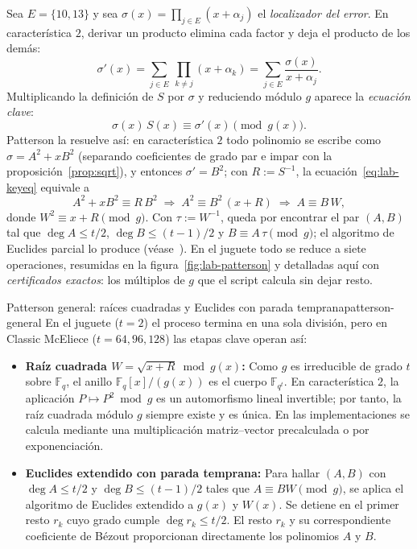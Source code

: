 \documentclass[11pt,a4paper,oneside]{report}
\newcommand{\GF}[1]{\mathbb{F}_{#1}}
\begin{document}
Sea $E=\{10,13\}$ y sea $\sigma(x)=\prod_{j\in E}(x+\alpha_j)$ el
\emph{localizador del error}. En característica $2$, derivar un producto
elimina cada factor y deja el producto de los demás:
\[
\sigma'(x)=\sum_{j\in E}\ \prod_{k\neq j}(x+\alpha_k)
=\sum_{j\in E}\frac{\sigma(x)}{x+\alpha_j}.
\]
Multiplicando la definición de $S$ por $\sigma$ y reduciendo módulo $g$
aparece la \emph{ecuación clave}:
\begin{equation}
\sigma(x)\,S(x)\equiv\sigma'(x)\pmod{g(x)}.
\label{eq:lab-keyeq}
\end{equation}
Patterson la resuelve así: en característica $2$ todo polinomio se
escribe como $\sigma=A^2+xB^2$ (separando coeficientes de grado par e
impar con la proposición~\ref{prop:sqrt}), y entonces $\sigma'=B^2$; con
$R:=S^{-1}$, la ecuación~\eqref{eq:lab-keyeq} equivale a
\[
A^2+xB^2\equiv R\,B^2
\;\Longrightarrow\;
A^2\equiv B^2\,(x+R)
\;\Longrightarrow\;
A\equiv B\,W,
\]
donde $W^2\equiv x+R\pmod g$. Con $\tau:=W^{-1}$, queda por encontrar el
par $(A,B)$ tal que $\deg A\le t/2$, $\deg B\le(t-1)/2$ y
$B\equiv A\,\tau\pmod g$; el algoritmo de Euclides parcial lo produce
(véase~\cite{patterson1975}). En el juguete todo se reduce a siete
operaciones, resumidas en la figura~\ref{fig:lab-patterson} y detalladas
aquí con \emph{certificados exactos}: los múltiplos de $g$ que el script
calcula sin dejar resto.

\begin{observacion}{Patterson general: raíces cuadradas y Euclides con parada temprana}{patterson-general}
En el juguete ($t=2$) el proceso termina en una sola división, pero en Classic McEliece
($t=64, 96, 128$) las etapas clave operan así:
\begin{itemize}[leftmargin=1.4em,itemsep=2pt]
  \item \textbf{Raíz cuadrada $W=\sqrt{x+R}\bmod g(x)$:} Como $g$ es irreducible de grado $t$
        sobre $\GF{q}$, el anillo $\GF{q}[x]/(g(x))$ es el cuerpo $\GF{q^t}$. En característica $2$,
        la aplicación $P\mapsto P^2\bmod g$ es un automorfismo lineal invertible; por tanto,
        la raíz cuadrada módulo $g$ siempre existe y es única. En las implementaciones se
        calcula mediante una multiplicación matriz--vector precalculada o por exponenciación.
  \item \textbf{Euclides extendido con parada temprana:} Para hallar $(A,B)$ con
        $\deg A \le t/2$ y $\deg B \le (t-1)/2$ tales que $A \equiv B W \pmod g$, se aplica el
        algoritmo de Euclides extendido a $g(x)$ y $W(x)$. Se detiene en el primer resto
        $r_k$ cuyo grado cumple $\deg r_k \le t/2$. El resto $r_k$ y su correspondiente
        coeficiente de Bézout proporcionan directamente los polinomios $A$ y $B$.
\end{itemize}
\end{observacion}
\end{document}
